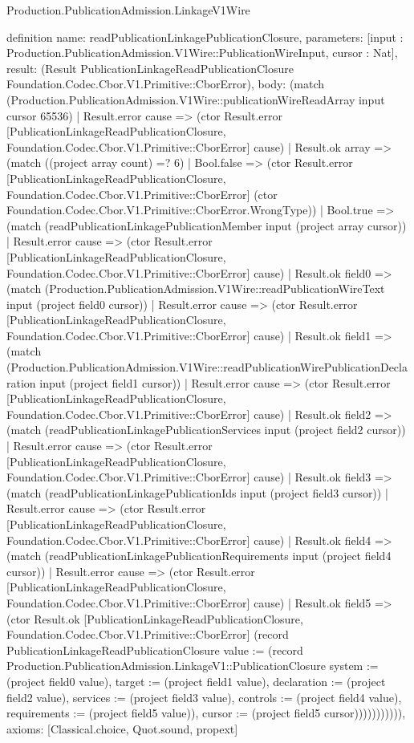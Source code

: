 \begin{lexlean}{Production.PublicationAdmission.LinkageV1Wire}
\begin{semanticmodule}
definition{
  name: readPublicationLinkagePublicationClosure,
  parameters: [input : Production.PublicationAdmission.V1Wire::PublicationWireInput, cursor : Nat],
  result: (Result PublicationLinkageReadPublicationClosure Foundation.Codec.Cbor.V1.Primitive::CborError),
  body: (match (Production.PublicationAdmission.V1Wire::publicationWireReadArray input cursor 65536)
    | Result.error cause => (ctor Result.error [PublicationLinkageReadPublicationClosure, Foundation.Codec.Cbor.V1.Primitive::CborError] cause)
    | Result.ok array => (match ((project array count) =? 6)
      | Bool.false => (ctor Result.error [PublicationLinkageReadPublicationClosure, Foundation.Codec.Cbor.V1.Primitive::CborError] (ctor Foundation.Codec.Cbor.V1.Primitive::CborError.WrongType))
      | Bool.true => (match (readPublicationLinkagePublicationMember input (project array cursor))
        | Result.error cause => (ctor Result.error [PublicationLinkageReadPublicationClosure, Foundation.Codec.Cbor.V1.Primitive::CborError] cause)
        | Result.ok field0 => (match (Production.PublicationAdmission.V1Wire::readPublicationWireText input (project field0 cursor))
          | Result.error cause => (ctor Result.error [PublicationLinkageReadPublicationClosure, Foundation.Codec.Cbor.V1.Primitive::CborError] cause)
          | Result.ok field1 => (match (Production.PublicationAdmission.V1Wire::readPublicationWirePublicationDeclaration input (project field1 cursor))
            | Result.error cause => (ctor Result.error [PublicationLinkageReadPublicationClosure, Foundation.Codec.Cbor.V1.Primitive::CborError] cause)
            | Result.ok field2 => (match (readPublicationLinkagePublicationServices input (project field2 cursor))
              | Result.error cause => (ctor Result.error [PublicationLinkageReadPublicationClosure, Foundation.Codec.Cbor.V1.Primitive::CborError] cause)
              | Result.ok field3 => (match (readPublicationLinkagePublicationIds input (project field3 cursor))
                | Result.error cause => (ctor Result.error [PublicationLinkageReadPublicationClosure, Foundation.Codec.Cbor.V1.Primitive::CborError] cause)
                | Result.ok field4 => (match (readPublicationLinkagePublicationRequirements input (project field4 cursor))
                  | Result.error cause => (ctor Result.error [PublicationLinkageReadPublicationClosure, Foundation.Codec.Cbor.V1.Primitive::CborError] cause)
                  | Result.ok field5 => (ctor Result.ok [PublicationLinkageReadPublicationClosure, Foundation.Codec.Cbor.V1.Primitive::CborError] (record PublicationLinkageReadPublicationClosure {value := (record Production.PublicationAdmission.LinkageV1::PublicationClosure {system := (project field0 value), target := (project field1 value), declaration := (project field2 value), services := (project field3 value), controls := (project field4 value), requirements := (project field5 value)}), cursor := (project field5 cursor)})))))))))),
  axioms: [Classical.choice, Quot.sound, propext]
}


\end{semanticmodule}
\end{lexlean}
